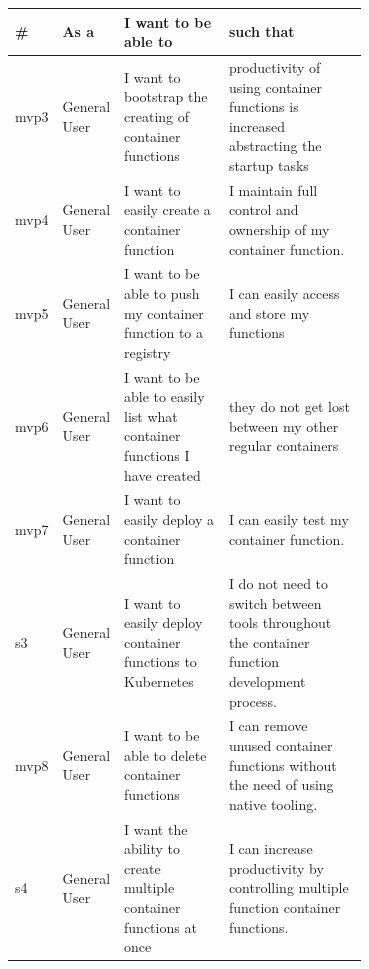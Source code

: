 \begin{table}[!ht]
\begin{tabular}{|l|l|p{0.3\linewidth}|p{0.4\linewidth}|}
\hline
\textbf{\#} & \textbf{As a} & \textbf{I want to be able to}                                             & \textbf{such that}                                                                                                                                       \\ \hline
mvp3        & General User  & I want to bootstrap the creating of container functions                   & productivity of using container functions is increased abstracting the startup tasks                               \\ \hline
mvp4        & General User  & I want to easily create a container function                              & I maintain full control and ownership of my container function.                                                                                          \\ \hline
mvp5        & General User  & I want to be able to push my container function to a registry             & I can easily access and store my functions                                                                                                               \\ \hline
mvp6        & General User  & I want to be able to easily list what container functions I have created  & they do not get lost between my other regular containers                                                                                                 \\ \hline
mvp7        & General User  & I want to easily deploy a container function                              & I can easily test my container function.                                                                                                                 \\ \hline
s3          & General User  & I want to easily deploy container functions to Kubernetes                 & I do not need to switch between tools throughout the container function development process. \\ \hline
mvp8        & General User  & I want to be able to delete container functions                           & I can remove unused container functions without the need of using native tooling.                                                                        \\ \hline
s4          & General User  & I want the ability to create multiple container functions at once         & I can increase productivity by controlling multiple function container functions.                                                                        \\ \hline

\end{tabular}
\end{table}
